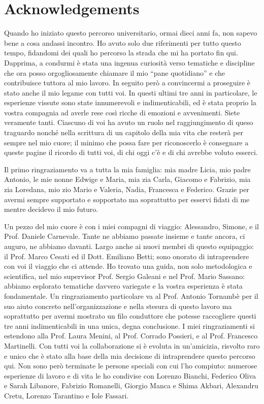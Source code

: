 \chapter*{Acknowledgements}

Quando ho iniziato questo percorso universitario, ormai dieci anni fa, non sapevo bene a cosa andassi incontro. Ho avuto solo due riferimenti per tutto questo tempo, fidandomi dei quali ho percorso la strada che mi ha portato fin qui. Dapprima, a condurmi è stata una ingenua curiosità verso tematiche e discipline che ora posso orgogliosamente chiamare il mio ``pane quotidiano'' e che contribuisce tuttora al mio lavoro. In seguito però a convincermi a proseguire è stato anche il mio legame con tutti voi. In questi ultimi tre anni in particolare, le esperienze vissute sono state innumerevoli e indimenticabili, ed è stata proprio la vostra compagnia ad averle rese così ricche di emozioni e avvenimenti. Siete veramente tanti. Ciascuno di voi ha avuto un ruolo nel raggiungimento di queso traguardo nonché nella scrittura di un capitolo della mia vita che resterà per sempre nel mio cuore; il minimo che possa fare per riconoscerlo è consegnare a queste pagine il ricordo di tutti voi, di chi oggi c'è e di chi avrebbe voluto esserci.

Il primo ringraziamento va a tutta la mia famiglia: mia madre Licia, mio padre Antonio, le mie nonne Edwige e Maria, mia zia Carla, Giacomo e Fabrizio, mia zia Loredana, mio zio Mario e Valeria, Nadia, Francesca e Federico. Grazie per avermi sempre supportato e sopportato ma soprattutto per esservi fidati di me mentre decidevo il mio futuro.

Un pezzo del mio cuore è con i miei compagni di viaggio: Alessandro, Simone, e il Prof. Daniele Carnevale. Tante ne abbiamo passate insieme e tante ancora, ci auguro, ne abbiamo davanti. Largo anche ai nuovi membri di questo equipaggio: il Prof. Marco Cesati ed il Dott. Emiliano Betti; sono onorato di intraprendere con voi il viaggio che ci attende.
Ho trovato una guida, non solo metodologica e scientifica, nel mio supervisor Prof. Sergio Galeani e nel Prof. Mario Sassano: abbiamo esplorato tematiche davvero variegate e la vostra esperienza è stata fondamentale. Un ringraziamento particolare va al Prof. Antonio Tornambè per il suo aiuto concreto nell'organizzazione e nella stesura di questo lavoro ma soprattutto per avermi mostrato un filo conduttore che potesse raccogliere questi tre anni indimenticabili in una unica, degna conclusione. I miei ringraziamenti si estendono alla Prof. Laura Menini, al Prof. Corrado Possieri, e al Prof. Francesco Martinelli. Con tutti voi la collaborazione si è evoluta in un'amicizia, risvolto raro e unico che è stato alla base della mia decisione di intraprendere questo percorso qui.
Non sono però terminate le persone speciali con cui l'ho compiuto: numerose esperienze di lavoro e di vita le ho condivise con Lorenzo Bianchi, Federico Oliva e Sarah Libanore, Fabrizio Romanelli, Giorgio Manca e Shima Akbari, Alexandru Cretu, Lorenzo Tarantino e Iole Fassari.

